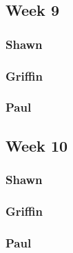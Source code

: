 \documentclass[10pt,draftclsnofoot,onecolumn]{IEEEtran}
\begin{document}
\subsection{Week 9}
\subsubsection{Shawn}
\subsubsection{Griffin}
\subsubsection{Paul}

\subsection{Week 10}
\subsubsection{Shawn}
\subsubsection{Griffin}
\subsubsection{Paul}
\end{document}
